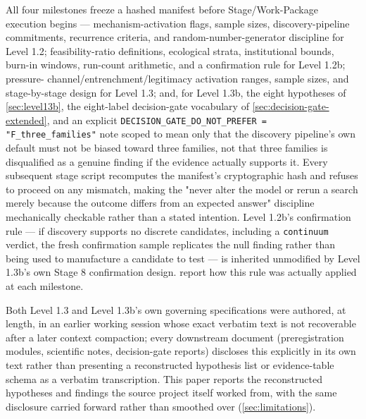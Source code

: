 All four milestones freeze a hashed manifest before Stage/Work-Package
execution begins --- mechanism-activation flags, sample sizes,
discovery-pipeline commitments, recurrence criteria, and
random-number-generator discipline for Level 1.2; feasibility-ratio
definitions, ecological strata, institutional bounds, burn-in windows,
run-count arithmetic, and a confirmation rule for Level 1.2b; pressure-
channel/entrenchment/legitimacy activation ranges, sample sizes, and
stage-by-stage design for Level 1.3; and, for Level 1.3b, the eight
hypotheses of \cref{sec:level13b}, the eight-label decision-gate vocabulary
of \cref{sec:decision-gate-extended}, and an explicit
\texttt{DECISION\_GATE\_DO\_NOT\_PREFER = "F\_three\_families"} note scoped
to mean only that the discovery pipeline's own default must not be biased
toward three families, not that three families is disqualified as a
genuine finding if the evidence actually supports it. Every subsequent
stage script recomputes the manifest's cryptographic hash and refuses to
proceed on any mismatch, making the "never alter the model or rerun a
search merely because the outcome differs from an expected answer"
discipline mechanically checkable rather than a stated intention. Level
1.2b's confirmation rule --- if discovery supports no discrete candidates,
including a \texttt{continuum} verdict, the fresh confirmation sample
replicates the null finding rather than being used to manufacture a
candidate to test --- is inherited unmodified by Level 1.3b's own Stage 8
confirmation design.  report
how this rule was actually applied at each milestone.

Both Level 1.3 and Level 1.3b's own governing specifications were
authored, at length, in an earlier working session whose exact verbatim
text is not recoverable after a later context compaction; every downstream
document (preregistration modules, scientific notes, decision-gate reports)
discloses this explicitly in its own text rather than presenting a
reconstructed hypothesis list or evidence-table schema as a verbatim
transcription. This paper reports the reconstructed hypotheses and
findings the source project itself worked from, with the same disclosure
carried forward rather than smoothed over (\cref{sec:limitations}).

